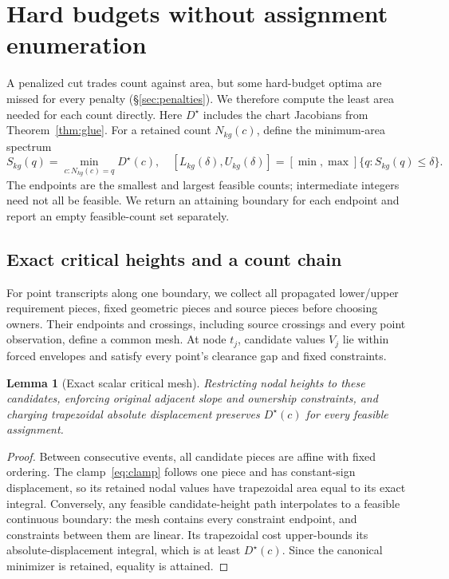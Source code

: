 \documentclass[10pt,letterpaper]{article}
\newtheorem{lemma}[theorem]{Lemma}
\begin{document}
\section{Hard budgets without assignment enumeration}\label{sec:counts}
A penalized cut trades count against area, but some hard-budget optima are missed for every penalty (\S\ref{sec:penalties}). We therefore compute the least area needed for each count directly.
Here $D^\star$ includes the chart Jacobians from Theorem~\ref{thm:glue}. For a retained count $N_{kg}(c)$, define the minimum-area spectrum
\begin{equation}
S_{kg}(q)=\min_{c:N_{kg}(c)=q}D^\star(c),\quad
[L_{kg}(\delta),U_{kg}(\delta)]=\left[\min,\max\right]\{q:S_{kg}(q)\le\delta\}.\label{eq:interval}
\end{equation}
The endpoints are the smallest and largest feasible counts; intermediate integers need not all be feasible. We return an attaining boundary for each endpoint and report an empty feasible-count set separately.

\subsection{Exact critical heights and a count chain}
For point transcripts along one boundary, we collect all propagated lower/upper requirement pieces, fixed geometric pieces and source pieces before choosing owners. Their endpoints and crossings, including source crossings and every point observation, define a common mesh. At node $t_j$, candidate values $V_j$ lie within forced envelopes and satisfy every point's clearance gap and fixed constraints.

\begin{lemma}[Exact scalar critical mesh]\label{lem:mesh}
Restricting nodal heights to these candidates, enforcing original adjacent slope and ownership constraints, and charging trapezoidal absolute displacement preserves $D^\star(c)$ for every feasible assignment.
\end{lemma}
\begin{proof}
Between consecutive events, all candidate pieces are affine with fixed ordering. The clamp~\eqref{eq:clamp} follows one piece and has constant-sign displacement, so its retained nodal values have trapezoidal area equal to its exact integral. Conversely, any feasible candidate-height path interpolates to a feasible continuous boundary: the mesh contains every constraint endpoint, and constraints between them are linear. Its trapezoidal cost upper-bounds its absolute-displacement integral, which is at least $D^\star(c)$. Since the canonical minimizer is retained, equality is attained.
\end{proof}
\end{document}
